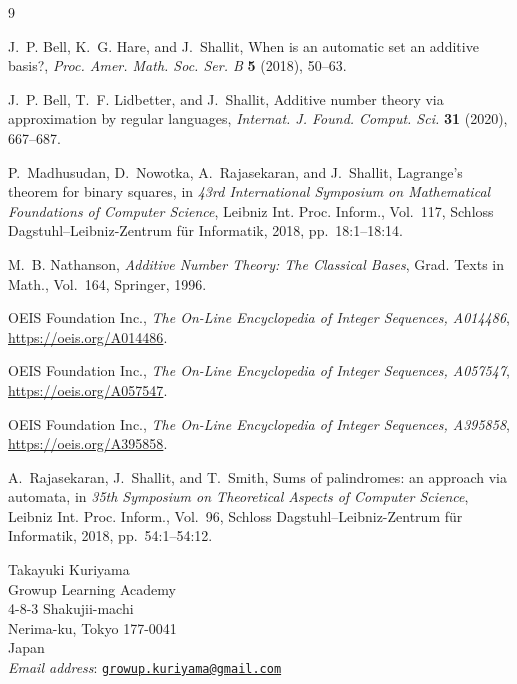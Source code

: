 \documentclass[12pt]{article}
\theoremstyle{plain}
\begin{document}
\begin{thebibliography}{9}

J.~P. Bell, K.~G. Hare, and J.~Shallit,
When is an automatic set an additive basis?,
\emph{Proc. Amer. Math. Soc. Ser. B} \textbf{5} (2018), 50--63.

J.~P. Bell, T.~F. Lidbetter, and J.~Shallit,
Additive number theory via approximation by regular languages,
\emph{Internat. J. Found. Comput. Sci.} \textbf{31} (2020), 667--687.

P.~Madhusudan, D.~Nowotka, A.~Rajasekaran, and J.~Shallit,
Lagrange's theorem for binary squares,
in \emph{43rd International Symposium on Mathematical Foundations of
Computer Science}, Leibniz Int. Proc. Inform., Vol.~117, Schloss
Dagstuhl--Leibniz-Zentrum f{\"u}r Informatik, 2018, pp.~18:1--18:14.

M.~B. Nathanson,
\emph{Additive Number Theory: The Classical Bases},
Grad. Texts in Math., Vol.~164, Springer, 1996.

OEIS Foundation Inc.,
\emph{The On-Line Encyclopedia of Integer Sequences, A014486},
\url{https://oeis.org/A014486}.

OEIS Foundation Inc.,
\emph{The On-Line Encyclopedia of Integer Sequences, A057547},
\url{https://oeis.org/A057547}.

OEIS Foundation Inc.,
\emph{The On-Line Encyclopedia of Integer Sequences, A395858},
\url{https://oeis.org/A395858}.

A.~Rajasekaran, J.~Shallit, and T.~Smith,
Sums of palindromes: an approach via automata,
in \emph{35th Symposium on Theoretical Aspects of Computer Science},
Leibniz Int. Proc. Inform., Vol.~96, Schloss Dagstuhl--Leibniz-Zentrum
f{\"u}r Informatik, 2018, pp.~54:1--54:12.

\end{thebibliography}


\begin{flushleft}
Takayuki Kuriyama\\
Growup Learning Academy\\
4-8-3 Shakujii-machi\\
Nerima-ku, Tokyo 177-0041\\
Japan\\
\textit{Email address}: \href{mailto:growup.kuriyama@gmail.com}
{\texttt{growup.kuriyama@gmail.com}}
\end{flushleft}
\end{document}
